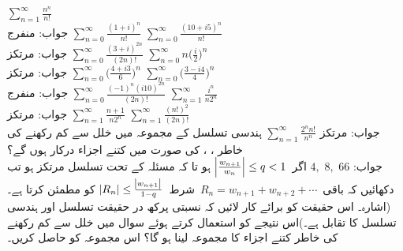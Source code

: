 \quad
$\sum\limits_{n=1}^{\infty} \tfrac{n^n}{n!}$\\
جواب:\quad
منفرج
\quad
$\sum\limits_{n=0}^{\infty}\tfrac{(1+i)^n}{n!}$
\quad
$\sum\limits_{n=0}^{\infty}\tfrac{(10+i5)^n}{n!}$\\
جواب:\quad
مرتکز
\quad
$\sum\limits_{n=0}^{\infty}\tfrac{(3+i)^{2n}}{(2n)!}$
\quad
$\sum\limits_{n=0}^{\infty}n\big(\tfrac{i}{2}\big)^n$\\
جواب:\quad
مرتکز
\quad
$\sum\limits_{n=0}^{\infty}\big(\tfrac{4+i3}{6}\big)^n$
\quad
$\sum\limits_{n=0}^{\infty}\big(\tfrac{3-i4}{4}\big)^n$\\
جواب:\quad
منفرج
\quad
$\sum\limits_{n=0}^{\infty}\tfrac{(-1)^n(i10)^{2n}}{(2n)!}$
\quad
$\sum\limits_{n=1}^{\infty}\tfrac{i^n}{n2^n}$\\
جواب:\quad
مرتکز
\quad
$\sum\limits_{n=1}^{\infty}\tfrac{n+1}{n2^n}$
\quad
$\sum\limits_{n=1}^{\infty}\tfrac{(n!)^2}{(2n)!}$\\
جواب:\quad
مرتکز
\quad
$\sum\limits_{n=1}^{\infty}\tfrac{2^n n!}{n^n}$
\quad
ہندسی تسلسل  کے مجموعہ   میں خلل  سے کم رکھنے کی خاطر ، ،  کی صورت میں کتنے اجزاء درکار ہوں گے؟\\
جواب:\quad
$4,\,\, 8,\,\, 66$
\quad
اگر 
$\,\abs{\tfrac{w_{n+1}}{w_n}}\le q<1\,$
ہو تا کہ مسئلہ  کے تحت تسلسل  مرتکز ہو تب دکھائیں کہ باقی
$\,R_n=w_{n+1}+w_{n+2}+\cdots\,$
شرط
$\,\abs{R_n}\le \tfrac{\abs{w_{n+1}}}{1-q}\,$
کو مطمئن کرتا ہے۔(اشارہ۔ اس حقیقت کو برائے کار لائیں کہ نسبتی پرکھ در حقیقت تسلسل  اور ہندسی تسلسل کا تقابل ہے۔)اس نتیجے کو استعمال کرتے  ہوئے  سوال  میں خلل  سے کم رکھنے کی خاطر کتنے اجزاء کا مجموعہ  لینا ہو گا؟  اس مجموعہ  کو حاصل کریں۔

